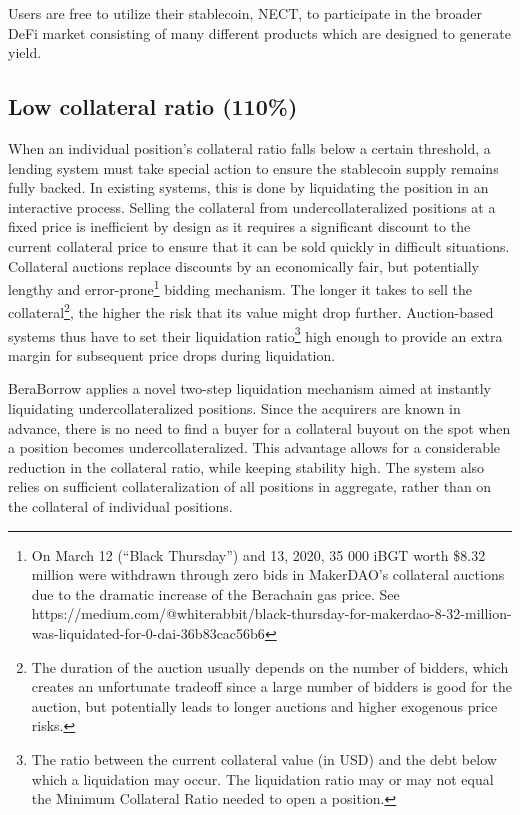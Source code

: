 \documentclass{article}
\begin{document}
Users are free to utilize their stablecoin, NECT, to participate in the broader DeFi market consisting of many different products which are designed to generate yield.

\subsection{Low collateral ratio (110\%)}
When an individual position’s collateral ratio falls below a certain threshold, a lending system must take special action to ensure the stablecoin supply remains fully backed. In existing systems, this is done by liquidating the position in an interactive process. Selling the collateral from undercollateralized positions at a fixed price is inefficient by design as it requires a significant discount to the current collateral price to ensure that it can be sold quickly in difficult situations. Collateral auctions replace discounts by an economically fair, but potentially lengthy and error-prone\footnote{On March 12 (“Black Thursday”) and 13, 2020, 35 000 iBGT worth \$8.32 million were withdrawn through zero bids in MakerDAO’s collateral auctions due to the dramatic increase of the Berachain gas price. See https://medium.com/@whiterabbit/black-thursday-for-makerdao-8-32-million-was-liquidated-for-0-dai-36b83cac56b6} bidding mechanism. The longer it takes to sell the collateral\footnote{The duration of the auction usually depends on the number of bidders, which creates an unfortunate tradeoff since a large number of bidders is good for the auction, but potentially leads to longer auctions and higher exogenous price risks.}, the higher the risk that its value might drop further. Auction-based systems thus have to set their liquidation ratio\footnote{The ratio between the current collateral value (in USD) and the debt below which a liquidation may occur. The liquidation ratio may or may not equal the Minimum Collateral Ratio needed to open a position.} high enough to provide an extra margin for subsequent price drops during liquidation.

BeraBorrow applies a novel two-step liquidation mechanism aimed at instantly liquidating undercollateralized positions. Since the acquirers are known in advance, there is no need to find a buyer for a collateral buyout on the spot when a position becomes undercollateralized. This advantage allows for a considerable reduction in the collateral ratio, while keeping stability high. The system also relies on sufficient collateralization of all positions in aggregate, rather than on the collateral of individual positions.
\end{document}
